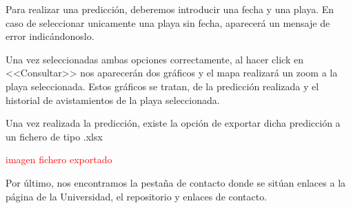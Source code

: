 Para realizar una predicción, deberemos introducir una fecha y una playa. En caso de seleccionar unicamente una playa sin fecha, aparecerá un mensaje de error indicándonoslo.

\label{pagina_error_fecha}

Una vez seleccionadas ambas opciones correctamente, al hacer click en <<Consultar>> nos aparecerán dos gráficos y el mapa realizará un zoom a la playa seleccionada. Estos gráficos se tratan, de la predicción realizada y el historial de avistamientos de la playa seleccionada. 

\label{pagina_consulta}

Una vez realizada la predicción, existe la opción de exportar dicha predicción a un fichero de tipo .xlsx

\textcolor{red}{imagen fichero exportado}

Por último, nos encontramos la pestaña de contacto donde se sitúan enlaces a la página de la Universidad, el repositorio y enlaces de contacto.

\label{pagina_contacto}